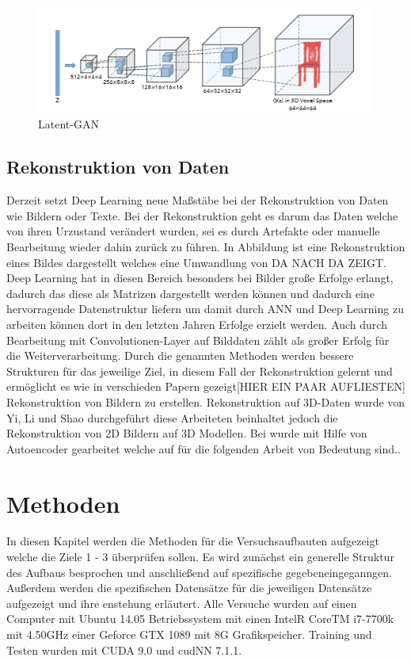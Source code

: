 \documentclass{llncs}
\begin{document}
\begin{figure}[htbp] 
	\centering
	\includegraphics[width=1.2\textwidth]{3dgan.png}
	\caption{Latent-GAN}
	\label{fig:Bild30}
\end{figure}
\cite{3d}

\subsection{Rekonstruktion von Daten}

Derzeit setzt Deep Learning neue Maßstäbe bei der Rekonstruktion von Daten wie Bildern oder Texte. Bei der Rekonstruktion geht es darum das Daten welche von ihren Urzustand verändert wurden, sei es durch Artefakte oder manuelle Bearbeitung wieder dahin zurück zu führen. In Abbildung ist eine Rekonstruktion eines Bildes dargestellt welches eine Umwandlung von DA NACH DA ZEIGT. Deep Learning hat in diesen Bereich besonders bei Bilder große Erfolge erlangt, dadurch das diese als Matrizen dargestellt werden können und dadurch eine hervorragende Datenstruktur liefern um damit durch ANN und Deep Learning zu arbeiten können dort in den letzten Jahren Erfolge erzielt werden. Auch durch Bearbeitung mit Convolutionen-Layer auf Bilddaten zählt als großer Erfolg für die Weiterverarbeitung\cite{imagerecon}. Durch die genannten Methoden werden bessere Strukturen für das jeweilige Ziel, in diesem Fall der Rekonstruktion gelernt und ermöglicht es wie in verschieden Papern gezeigt[HIER EIN PAAR AUFLIESTEN] Rekonstruktion von Bildern zu erstellen. Rekonstruktion auf 3D-Daten wurde von Yi, Li und Shao \cite{3d_recon} durchgeführt diese Arbeiteten beinhaltet jedoch die Rekonstruktion von 2D Bildern auf 3D Modellen. Bei wurde mit Hilfe von Autoencoder gearbeitet welche auf für die folgenden Arbeit von Bedeutung sind.\cite{3d_recon}. 

\section{Methoden}
In diesen Kapitel werden die Methoden für die Versuchsaufbauten aufgezeigt welche die Ziele 1 - 3 überprüfen sollen. Es wird zunächst ein generelle Struktur des Aufbaus besprochen und anschließend auf spezifische gegebeneingeganngen. Außerdem werden die spezifischen Datensätze für die jeweiligen Datensätze aufgezeigt und ihre enstehung erläutert. Alle Versuche wurden auf einen Computer mit Ubuntu 14.05 Betriebssystem mit einen IntelR CoreTM i7-7700k mit 4.50GHz einer Geforce GTX 1089 mit 8G Grafikspeicher. Training und Testen wurden mit CUDA 9.0 und cudNN 7.1.1.
\end{document}
